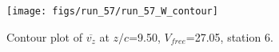 \begin{figure}[H]
\centering
\texttt{[image: figs/run\_57/run\_57\_W\_contour]}
\caption{Contour plot of $\overline{v_{z}}$ at $z/c$=9.50, $V_{free}$=27.05, station 6.}
\label{fig:run_57_W_contour}
\end{figure}


